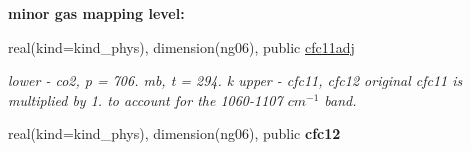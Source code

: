 \begin{Indent}\textbf{ minor gas mapping level\+:}\par
\begin{DoxyCompactItemize}
\item 
real(kind=kind\+\_\+phys), dimension(ng06), public \hyperlink{group__module__radlw__kgbnn_ga8b0813723ba69b1afbe2552f6b730267}{cfc11adj}
\begin{DoxyCompactList}\small\item\em lower -\/ co2, p = 706. mb, t = 294. k upper -\/ cfc11, cfc12 original cfc11 is multiplied by 1. to account for the 1060-\/1107 $cm^{-1}$ band. \end{DoxyCompactList}\item 
real(kind=kind\+\_\+phys), dimension(ng06), public {\bfseries cfc12}
\end{DoxyCompactItemize}
\end{Indent}
